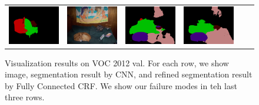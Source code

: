 \begin{figure}[!htbp]
{\begin{tabular}{c c c | c c c}
    \includegraphics[height=0.12\linewidth]{fig/res_crf/2007_000452.png} &
    \includegraphics[height=0.12\linewidth]{fig/img/2007_002268.jpg} &
    \includegraphics[height=0.12\linewidth]{fig/res_none/2007_002268.png} &
    \includegraphics[height=0.12\linewidth]{fig/res_crf/2007_002268.png} \\
  \end{tabular}
  }
  \caption{Visualization results on VOC 2012 val. For each row, we show image, segmentation result by CNN, and refined segmentation result by Fully Connected CRF. We show our failure modes in teh last three rows.} 
  \label{fig:ValResults}
\end{figure}
